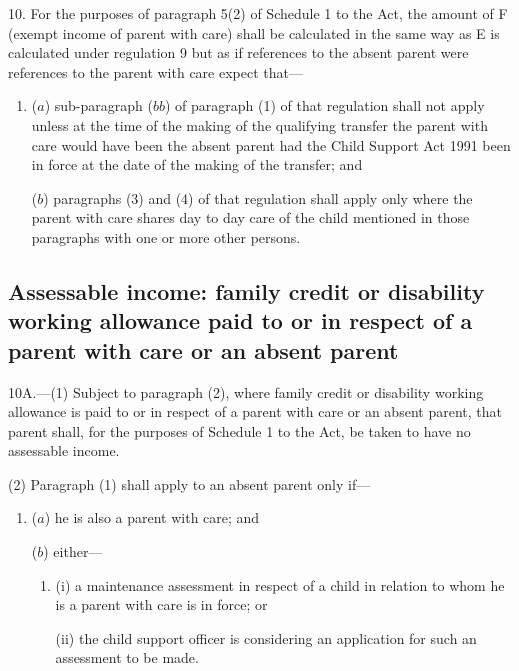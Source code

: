 \documentclass[12pt,a4paper]{article}
\begin{document}
10.  For the purposes of paragraph 5(2) of Schedule 1 to the Act, the amount of F (exempt income of parent with care) shall be calculated in the same way as E is calculated under regulation 9 but as if references to the absent parent were references to the parent with care
expect that—
\begin{enumerate}\item[]
($a$) sub-paragraph ($bb$) of paragraph (1) of that regulation shall not apply unless at the time of the making of the qualifying transfer the parent with care would have been the absent parent had the Child Support Act 1991 been in force at the date of the making of the transfer; and

($b$) paragraphs (3) and (4) of that regulation shall apply only where the parent with care shares day to day care of the child mentioned in those paragraphs with one or more other persons.
\end{enumerate}  %


\subsection[10A. Assessable income: family credit or disability working allowance paid to or in respect of a parent with care or an absent parent]{\sloppy Assessable income: family credit or disability working allowance paid to or in respect of a parent with care or an absent parent}

10A.—(1) Subject to paragraph (2), where family credit or disability working allowance is paid to or in respect of a parent with care or an absent parent, that parent shall, for the purposes of Schedule 1 to the Act, be taken to have no assessable income.

(2) Paragraph (1) shall apply to an absent parent only if—
\begin{enumerate}\item[]
($a$) he is also a parent with care; and

($b$) either—
\begin{enumerate}\item[]
(i) a maintenance assessment in respect of a child in relation to whom he is a parent with care is in force; or

(ii) the child support officer is considering an application for such an assessment to be made.
\end{enumerate}
\end{enumerate}
\end{document}
